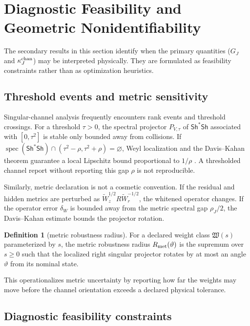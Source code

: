 \documentclass[review]{siamart220329}
\theoremstyle{definition}
\newtheorem{definition}[theorem]{Definition}
\theoremstyle{remark}
\newcommand{\Sh}{\mathsf{Sh}}
\newcommand{\spec}{\operatorname{spec}}
\begin{document}
\section{Diagnostic Feasibility and Geometric Nonidentifiability}\label{sec:thresholds}

The secondary results in this section identify when the primary quantities ($G_J$ and $\kappa_J^{\rm chan}$) may be interpreted physically. They are formulated as feasibility constraints rather than as optimization heuristics.

\subsection{Threshold events and metric sensitivity}

Singular-channel analysis frequently encounters rank events and threshold crossings. For a threshold $\tau>0$, the spectral projector $P_{V,\tau}$ of $\Sh^*\Sh$ associated with $[0,\tau^2]$ is stable only bounded away from collisions. If $\spec(\Sh^*\Sh)\cap(\tau^2-\rho,\tau^2+\rho)=\varnothing$, Weyl localization and the Davis--Kahan theorem guarantee a local Lipschitz bound proportional to $1/\rho$ \cite{DavisKahan1970}. A thresholded channel report without reporting this gap $\rho$ is not reproducible.

Similarly, metric declaration is not a cosmetic convention. If the residual and hidden metrics are perturbed as $\widetilde W_z^{1/2}R\widetilde W_r^{-1/2}$, the whitened operator changes. If the operator error $\delta_W$ is bounded away from the metric spectral gap $\rho_J/2$, the Davis--Kahan estimate bounds the projector rotation. 

\begin{definition}[metric robustness radius]\label{def:metric-robustness-radius}
For a declared weight class $\mathfrak W(s)$ parameterized by $s$, the metric robustness radius $R_{\rm met}(\vartheta)$ is the supremum over $s \ge 0$ such that the localized right singular projector rotates by at most an angle $\vartheta$ from its nominal state. 
\end{definition}
This operationalizes metric uncertainty by reporting how far the weights may move before the channel orientation exceeds a declared physical tolerance.

\subsection{Diagnostic feasibility constraints}
\end{document}
